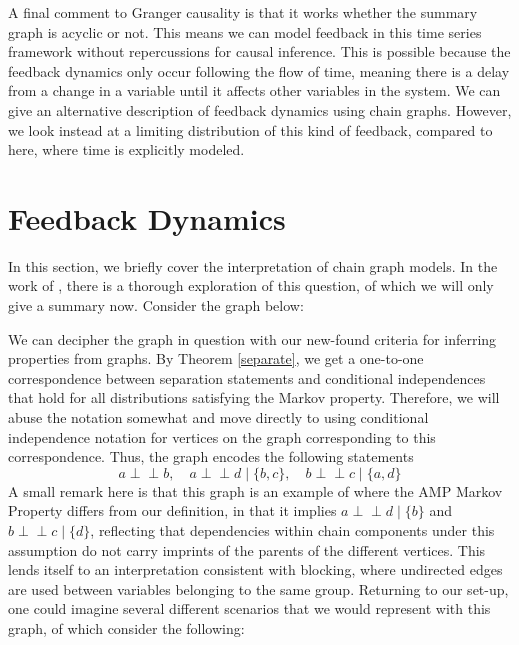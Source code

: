 \documentclass[11pt, a4paper]{memoir}
\theoremstyle{break}
\theoremstyle{break}
\theoremstyle{nonumberplain}
\newcommand{\indep}{\perp \!\!\! \perp}
\begin{document}
A final comment to Granger causality is that it works whether the summary graph is acyclic or not. This means we can model feedback in this time series framework without repercussions for causal inference. This is possible because the feedback dynamics only occur following the flow of time, meaning there is a delay from a change in a variable until it affects other variables in the system. We can give an alternative description of feedback dynamics using chain graphs. However, we look instead at a limiting distribution of this kind of feedback, compared to here, where time is explicitly modeled.
\section{Feedback Dynamics}
In this section, we briefly cover the interpretation of chain graph models. In the work of \cite{ChainGraph}, there is a thorough exploration of this question, of which we will only give a summary now. Consider the graph below:
\begin{center}
\end{center}
We can decipher the graph in question with our new-found criteria for inferring properties from graphs. By Theorem \ref{separate}, we get a one-to-one correspondence between separation statements and conditional independences that hold for all distributions satisfying the Markov property. Therefore, we will abuse the notation somewhat and move directly to using conditional independence notation for vertices on the graph corresponding to this correspondence. Thus, the graph encodes the following statements
$$a\indep b,\quad a\indep d\mid \{b,c\},\quad b\indep c\mid \{a,d\}$$
A small remark here is that this graph is an example of where the AMP Markov Property differs from our definition, in that it implies $a\indep d\mid\{b\}$ and $b\indep c\mid\{d\}$, reflecting that dependencies within chain components under this assumption do not carry imprints of the parents of the different vertices. This lends itself to an interpretation consistent with blocking, where undirected edges are used between variables belonging to the same group. Returning to our set-up, one could imagine several different scenarios that we would represent with this graph, of which \cite{ChainGraph} consider the following:
\end{document}
